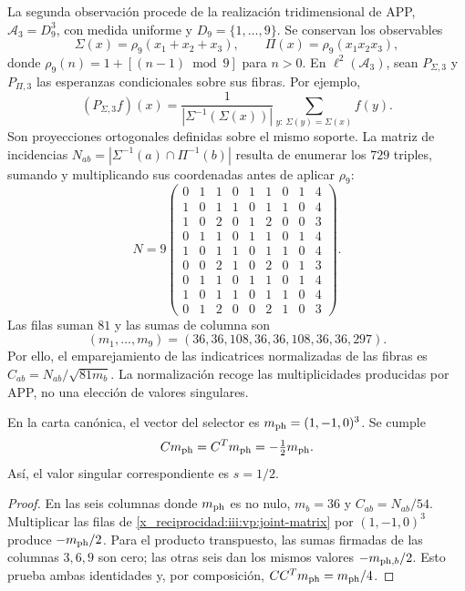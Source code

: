 La segunda observación procede de la realización tridimensional de APP,
$\mathcal A_3=D_9^3$, con medida uniforme y
$D_9=\{1,\ldots,9\}$. Se conservan los observables
\[
 \Sigma(x)=\rho_9(x_1+x_2+x_3),\qquad
 \Pi(x)=\rho_9(x_1x_2x_3),
\]
donde $\rho_9(n)=1+[(n-1)\bmod9]$ para $n>0$. En
$\ell^2(\mathcal A_3)$, sean $P_{\Sigma,3}$ y $P_{\Pi,3}$ las
esperanzas condicionales sobre sus fibras. Por ejemplo,
\[
 (P_{\Sigma,3}f)(x)=
 \frac1{|\Sigma^{-1}(\Sigma(x))|}
 \sum_{y:\,\Sigma(y)=\Sigma(x)}f(y).
\]
Son proyecciones ortogonales definidas sobre el mismo soporte. La matriz
de incidencias $N_{ab}=|\Sigma^{-1}(a)\cap\Pi^{-1}(b)|$ resulta de
enumerar los $729$ triples, sumando y multiplicando sus coordenadas antes
de aplicar $\rho_9$:
\begin{equation}
 N=9\begin{pmatrix}
 0&1&1&0&1&1&0&1&4\\
 1&0&1&1&0&1&1&0&4\\
 1&0&2&0&1&2&0&0&3\\
 0&1&1&0&1&1&0&1&4\\
 1&0&1&1&0&1&1&0&4\\
 0&0&2&1&0&2&0&1&3\\
 0&1&1&0&1&1&0&1&4\\
 1&0&1&1&0&1&1&0&4\\
 0&1&2&0&0&2&1&0&3
 \end{pmatrix}.
 \label{x_reciprocidad:iii:vp:joint-matrix}
\end{equation}
Las filas suman $81$ y las sumas de columna son
\[
 (m_1,\ldots,m_9)=(36,36,108,36,36,108,36,36,297).
\]
Por ello, el emparejamiento de las indicatrices normalizadas de las fibras
es $C_{ab}=N_{ab}/\sqrt{81m_b}$. La normalización recoge las
multiplicidades producidas por APP, no una elección de valores singulares.

\begin{proposition}
En la carta canónica, el vector del selector es
$m_{\rm ph}=(1,-1,0)^3$. Se cumple
\begin{equation}
 Cm_{\rm ph}=C^{\mathsf T}m_{\rm ph}=-\tfrac12m_{\rm ph}.
 \label{x_reciprocidad:iii:vp:trit-mode}
\end{equation}
Así, el valor singular correspondiente es $s=1/2$.
\end{proposition}
\begin{proof}
En las seis columnas donde $m_{\rm ph}$ es no nulo, $m_b=36$ y
$C_{ab}=N_{ab}/54$. Multiplicar las filas de
\eqref{x_reciprocidad:iii:vp:joint-matrix} por $(1,-1,0)^3$ produce
$-m_{\rm ph}/2$. Para el producto transpuesto, las sumas firmadas
de las columnas $3,6,9$ son cero; las otras seis dan los mismos
valores $-m_{{\rm ph},b}/2$. Esto prueba ambas identidades y, por
composición, $CC^{\mathsf T}m_{\rm ph}=m_{\rm ph}/4$.
\end{proof}

